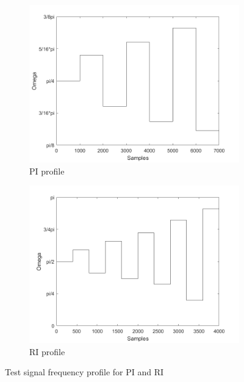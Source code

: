 \begin{figure}
    \begin{subfigure}{0.45\linewidth}
    \centering
    \includegraphics[width=\textwidth]{images/profiles/profile_pi.png}
    \caption{PI profile}
    \label{fig:profile_pi}
    \end{subfigure}
    \begin{subfigure}{0.45\linewidth}
    \centering
    \includegraphics[width=\textwidth]{images/profiles/profile_ri.png}
    \caption{RI profile}
    \label{fig:profile_ri}
    \end{subfigure}
    \caption{Test signal frequency profile for PI and RI}
    \label{fig:profiles}
\end{figure}